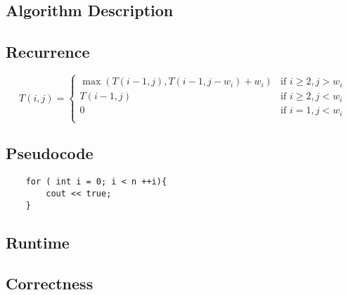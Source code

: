 \documentclass{article}
\author{Mary Sybersma}
\title{\class}
\begin{document}
\maketitle





\question
\subsection*{Algorithm Description}

\subsection*{Recurrence}
\begin{equation*} T(i,j) = 
        \begin{cases}  
        \max(T(i-1,j), T(i-1,j-w_{i}) + w_i) & \text{if } i \geq 2, j > w_i \\ 
                T(i-1,j)                     & \text{if } i \geq 2, j < w_i \\
                                0            & \text{if } i = 1, j < w_i  \\
        \end{cases} 
\end{equation*}

\subsection*{Pseudocode}
\begin{verbatim}
    for ( int i = 0; i < n ++i){
        cout << true; 
    }
\end{verbatim}

\subsection*{Runtime}

\subsection*{Correctness}



\togglefalse{showQuestion}
\question

\subquestion 
\lipsum 
\subquestion
\lipsum
\subquestion
\subquestion
\subquestion
\question 
\end{document}
